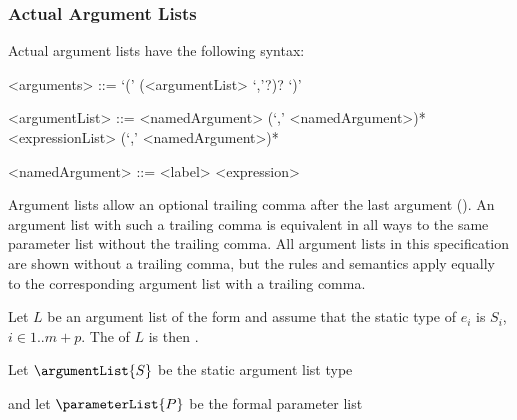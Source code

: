 \documentclass[makeidx]{article}
\begin{document}
{



\subsubsection{Actual Argument Lists}

\LMHash{}%
Actual argument lists have the following syntax:

\begin{grammar}
<arguments> ::= `(' (<argumentList> `,'?)? `)'

<argumentList> ::= <namedArgument> (`,' <namedArgument>)*
  \alt <expressionList> (`,' <namedArgument>)*

<namedArgument> ::= <label> <expression>
\end{grammar}

\LMHash{}%
Argument lists allow an optional trailing comma after the last argument
().
An argument list with such a trailing comma is equivalent in all ways to
the same parameter list without the trailing comma.
All argument lists in this specification are shown without a trailing comma,
but the rules and semantics apply equally to
the corresponding argument list with a trailing comma.

\LMHash{}%
Let $L$ be an argument list of the form
and assume that the static type of $e_i$ is $S_i$, $i \in 1 .. m+p$.
The  of $L$ is then
.

\LMHash{}%
Let $\argumentList{S}$ be the static argument list type

\noindent
{}

\noindent
and let $\parameterList{P}$ be the formal parameter list

}
\end{document}
